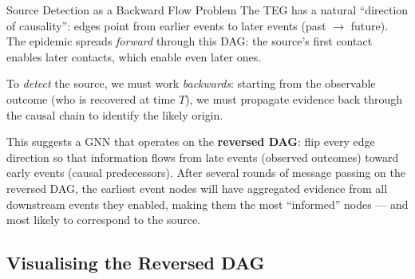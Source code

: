 \begin{conceptbox}{Source Detection as a Backward Flow Problem}
The TEG has a natural ``direction of causality'': edges point from earlier
events to later events (past $\to$ future). The epidemic spreads \emph{forward}
through this DAG: the source's first contact enables later contacts, which
enable even later ones.

To \emph{detect} the source, we must work \emph{backwards}: starting from the
observable outcome (who is recovered at time $T$), we must propagate evidence
back through the causal chain to identify the likely origin.

This suggests a GNN that operates on the \textbf{reversed DAG}: flip every
edge direction so that information flows from late events (observed outcomes)
toward early events (causal predecessors). After several rounds of message
passing on the reversed DAG, the earliest event nodes will have aggregated
evidence from all downstream events they enabled, making them the most
``informed'' nodes --- and most likely to correspond to the source.
\end{conceptbox}

\subsection{Visualising the Reversed DAG}

